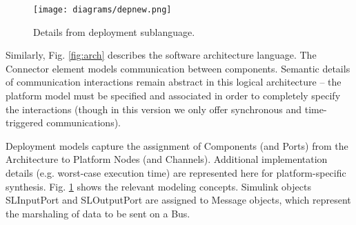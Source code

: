 \begin{figure}
	\centering
	\texttt{[image: diagrams/depnew.png]}
%	
	\caption{Details from deployment sublanguage.}
	\label{fig:depnew}
\end{figure}

Similarly, Fig. \ref{fig:arch} describes the software architecture language. The Connector element models communication between components.  Semantic details of communication interactions remain abstract in this logical architecture -- the platform model must be specified and associated in order to completely specify the interactions (though in this version we only offer synchronous and time-triggered communications).

Deployment models capture the assignment of Components (and Ports) from the Architecture to Platform Nodes (and Channels).  Additional implementation details (e.g. worst-case execution time) are represented here for platform-specific synthesis.  Fig. \ref{fig:depnew} shows the relevant modeling concepts.  Simulink objects SLInputPort and SLOutputPort are assigned to Message objects, which represent the marshaling of data to be sent on a Bus.


